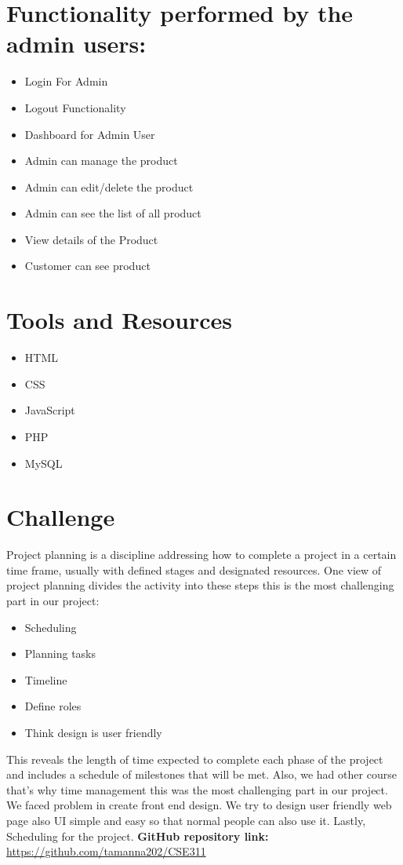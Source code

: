 \documentclass[12pt,letterpaper]{article}
\begin{document}
\section{Functionality performed by the admin users:}
\begin{itemize}
    \item 	Login For Admin
    \item 	Logout Functionality
    \item	Dashboard for Admin User
    \item Admin can manage the product
    \item	Admin can edit/delete the product
    \item	Admin can see the list of all product
    \item	View details of the Product
    \item  	Customer can see product
\end{itemize}

\hfill \break

\section{Tools and Resources}
\begin{itemize}
    \item 	HTML
    \item	CSS
    \item 	JavaScript
    \item PHP
    \item MySQL
\end{itemize}

\hfill \break

\section{Challenge}
     Project planning is a discipline addressing how to complete a project in a certain time frame, usually with defined stages and designated resources. One view of project planning divides the activity into these steps this is the most challenging part in our project: 
    \begin{itemize}
         \item	Scheduling
         \item Planning tasks
         \item Timeline
          \item Define roles
          \item Think design is user friendly
    \end{itemize}
     This reveals the length of time expected to complete each phase of the project and includes a schedule of milestones that will be met. Also, we had other course that’s why time management this was the most challenging part in our project. We faced problem in create front end design. We try to design user friendly web page also UI simple and easy so that normal people can also use it. Lastly, Scheduling for the project.
     \hfill \break
     \hfill \break
     {\bf GitHub repository link:}
     \url{https://github.com/tamanna202/CSE311}
\end{document}
